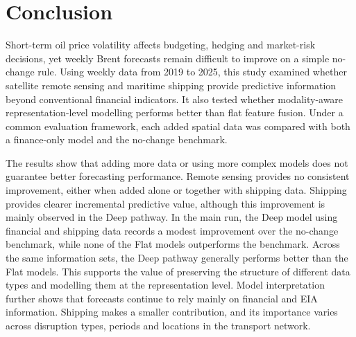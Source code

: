 \documentclass[
  british,
  12pt,
  oneside]{book}
\newcounter{none} %
\begin{document}
\chapter{Conclusion}\label{conclusion}

Short-term oil price volatility affects budgeting, hedging and market-risk decisions, yet weekly Brent forecasts remain difficult to improve on a simple no-change rule. Using weekly data from 2019 to 2025, this study examined whether satellite remote sensing and maritime shipping provide predictive information beyond conventional financial indicators. It also tested whether modality-aware representation-level modelling performs better than flat feature fusion. Under a common evaluation framework, each added spatial data was compared with both a finance-only model and the no-change benchmark.

The results show that adding more data or using more complex models does not guarantee better forecasting performance. Remote sensing provides no consistent improvement, either when added alone or together with shipping data. Shipping provides clearer incremental predictive value, although this improvement is mainly observed in the Deep pathway. In the main run, the Deep model using financial and shipping data records a modest improvement over the no-change benchmark, while none of the Flat models outperforms the benchmark. Across the same information sets, the Deep pathway generally performs better than the Flat models. This supports the value of preserving the structure of different data types and modelling them at the representation level. Model interpretation further shows that forecasts continue to rely mainly on financial and EIA information. Shipping makes a smaller contribution, and its importance varies across disruption types, periods and locations in the transport network.
\end{document}
